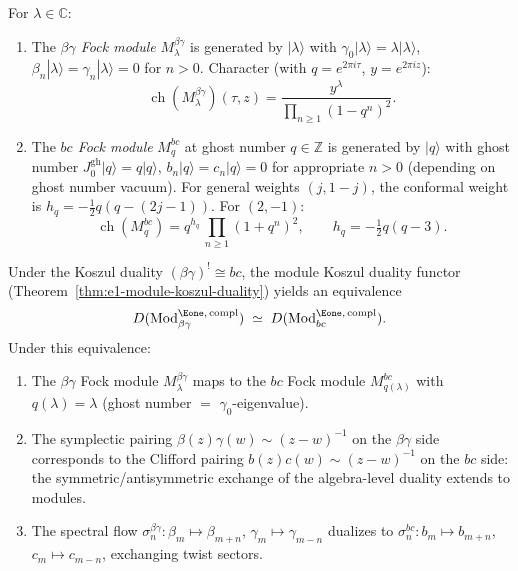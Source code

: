 \begin{definition}
\label{def:bg-bc-fock}
For $\lambda \in \mathbb{C}$:
\begin{enumerate}[label=\textup{(\roman*)}]
\item The \emph{$\beta\gamma$ Fock module} $M_\lambda^{\beta\gamma}$
  is generated by $|\lambda\rangle$ with
  $\gamma_0|\lambda\rangle = \lambda|\lambda\rangle$,
  $\beta_n|\lambda\rangle = \gamma_n|\lambda\rangle = 0$ for
  $n > 0$.  Character (with $q = e^{2\pi i\tau}$,
  $y = e^{2\pi i z}$):
  \[
  \operatorname{ch}(M_\lambda^{\beta\gamma})(\tau, z)
  = \frac{y^{\lambda}}{\prod_{n \geq 1}(1 - q^n)^2}.
  \]
\item The \emph{$bc$ Fock module} $M_q^{bc}$ at ghost number
  $q \in \mathbb{Z}$ is generated by $|q\rangle$ with
  ghost number $J_0^{\mathrm{gh}}|q\rangle = q|q\rangle$,
  $b_n|q\rangle = c_n|q\rangle = 0$ for appropriate
  $n > 0$ (depending on ghost number vacuum).
  For general weights $(j, 1{-}j)$, the conformal weight is
  $h_q = -\tfrac{1}{2}q(q - (2j{-}1))$.  For $(2, -1)$:
  \[
  \operatorname{ch}(M_q^{bc})
  = q^{h_q}\,\prod_{n \geq 1}(1 + q^n)^2,
  \qquad h_q = -\tfrac{1}{2}q(q-3).
  \]
\end{enumerate}
\end{definition}

\begin{proposition}
\label{prop:bg-bc-module-kd}
Under the Koszul duality $(\beta\gamma)^! \cong bc$, the
module Koszul duality functor
\textup{(}Theorem~\textup{\ref{thm:e1-module-koszul-duality})}
yields an equivalence
\begin{equation}\label{eq:bg-bc-module-equiv}
D(\mathrm{Mod}^{\Eone,\,\mathrm{compl}}_{\beta\gamma})
\;\simeq\;
D(\mathrm{Mod}^{\Eone,\,\mathrm{compl}}_{bc}).
\end{equation}
Under this equivalence:
\begin{enumerate}[label=\textup{(\roman*)}]
\item The $\beta\gamma$ Fock module $M_\lambda^{\beta\gamma}$
  maps to the $bc$ Fock module $M_{q(\lambda)}^{bc}$ with
  $q(\lambda) = \lambda$ \textup{(}ghost number
  $=$ $\gamma_0$-eigenvalue\textup{)}.
\item The symplectic pairing
  $\beta(z)\gamma(w) \sim (z-w)^{-1}$ on the $\beta\gamma$ side
  corresponds to the Clifford pairing
  $b(z)c(w) \sim (z-w)^{-1}$ on the $bc$ side: the
  symmetric/antisymmetric exchange of the algebra-level duality
  extends to modules.
\item The spectral flow
  $\sigma_n^{\beta\gamma}: \beta_m \mapsto \beta_{m+n}$,
  $\gamma_m \mapsto \gamma_{m-n}$ dualizes to
  $\sigma_n^{bc}: b_m \mapsto b_{m+n}$,
  $c_m \mapsto c_{m-n}$, exchanging twist sectors.
\end{enumerate}
\end{proposition}

